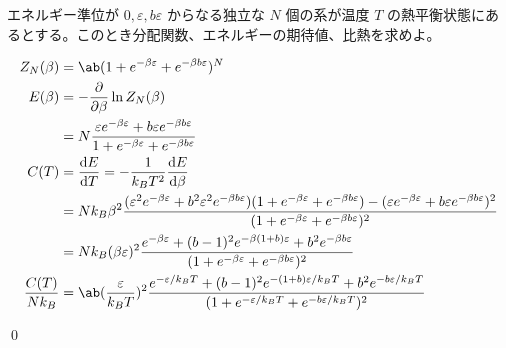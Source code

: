 \documentclass[uplatex,dvipdfmx,a4paper,11pt]{jlreq}
\makeatletter
\numberwithin{equation}{section}
\theoremstyle{definition}
\renewenvironment{proof}[1][\proofname]{\par
  \normalfont
  \topsep6\p@\@plus6\p@ \trivlist
  \item[\hskip\labelsep{\bfseries #1}\@addpunct{\bfseries}]\ignorespaces\quad\par
}{%
  \qed\endtrivlist\@endpefalse
}
\renewcommand\proofname{証明}
\makeatother
\begin{document}
\begin{problem}
エネルギー準位が $0, \varepsilon, b\varepsilon$ からなる独立な $N$ 個の系が温度 $T$ の熱平衡状態にあるとする。このとき分配関数、エネルギーの期待値、比熱を求めよ。
\end{problem}
\begin{proof}
  \begin{align}
    Z_N(\beta)        & = \ab(1 + e^{-\beta\varepsilon} + e^{-\beta b\varepsilon})^N                                                                                                                                                                                                                                      \\
    E(\beta)          & = -\diffp{}{\beta}\ln Z_N(\beta)                                                                                                                                                                                                                                                                  \\
                      & = N\frac{\varepsilon e^{-\beta\varepsilon} + b\varepsilon e^{-\beta b\varepsilon}}{1 + e^{-\beta\varepsilon} + e^{-\beta b\varepsilon}}                                                                                                                                                           \\
    C(T)              & = \diff{E}{T} = -\frac{1}{k_BT^2}\diff{E}{\beta}                                                                                                                                                                                                                                                  \\
                      & = Nk_B\beta^2\frac{(\varepsilon^2 e^{-\beta\varepsilon} + b^2\varepsilon^2 e^{-\beta b\varepsilon})(1 + e^{-\beta\varepsilon} + e^{-\beta b\varepsilon}) - (\varepsilon e^{-\beta\varepsilon} + b\varepsilon e^{-\beta b\varepsilon})^2}{(1 + e^{-\beta\varepsilon} + e^{-\beta b\varepsilon})^2} \\
                      & = Nk_B(\beta\varepsilon)^2\frac{e^{-\beta\varepsilon} + (b - 1)^2e^{-\beta(1 + b)\varepsilon} + b^2e^{-\beta b\varepsilon}}{(1 + e^{-\beta\varepsilon} + e^{-\beta b\varepsilon})^2}                                                                                                              \\
    \frac{C(T)}{Nk_B} & = \ab(\frac{\varepsilon}{k_BT})^2\frac{e^{-\varepsilon/k_BT} + (b - 1)^2e^{-(1 + b)\varepsilon/k_BT} + b^2e^{-b\varepsilon/k_BT}}{(1 + e^{-\varepsilon/k_BT} + e^{-b\varepsilon/k_BT})^2}
  \end{align}

\end{proof}
\end{document}
